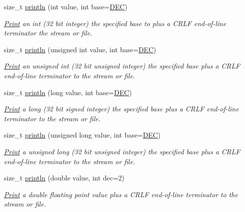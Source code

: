 \begin{DoxyCompactItemize}
size\+\_\+t \hyperlink{class_print_a82aa91bbd859f28a0a3b4869e5bfcadd}{println} (int value, int base=\hyperlink{docs_2src_2spark__wiring__print_8h_a26e216c38cffa0a9965fa7933ba558b1}{D\+EC})
\begin{DoxyCompactList}\small\item\em \hyperlink{class_print}{Print} an int (32 bit integer) the specified base to plus a C\+R\+LF end-\/of-\/line terminator the stream or file. \end{DoxyCompactList}\item 
size\+\_\+t \hyperlink{class_print_a2608232c1f10f654111ff447de16d60b}{println} (unsigned int value, int base=\hyperlink{docs_2src_2spark__wiring__print_8h_a26e216c38cffa0a9965fa7933ba558b1}{D\+EC})
\begin{DoxyCompactList}\small\item\em \hyperlink{class_print}{Print} an unsigned int (32 bit unsigned integer) the specified base plus a C\+R\+LF end-\/of-\/line terminator to the stream or file. \end{DoxyCompactList}\item 
size\+\_\+t \hyperlink{class_print_a82bbe59b28440c29e55ff3597eb45376}{println} (long value, int base=\hyperlink{docs_2src_2spark__wiring__print_8h_a26e216c38cffa0a9965fa7933ba558b1}{D\+EC})
\begin{DoxyCompactList}\small\item\em \hyperlink{class_print}{Print} a long (32 bit signed integer) the specified base plus a C\+R\+LF end-\/of-\/line terminator to the stream or file. \end{DoxyCompactList}\item 
size\+\_\+t \hyperlink{class_print_afa936d7e8dd329d9162f2cd28f42681e}{println} (unsigned long value, int base=\hyperlink{docs_2src_2spark__wiring__print_8h_a26e216c38cffa0a9965fa7933ba558b1}{D\+EC})
\begin{DoxyCompactList}\small\item\em \hyperlink{class_print}{Print} a unsigned long (32 bit unsigned integer) the specified base plus a C\+R\+LF end-\/of-\/line terminator to the stream or file. \end{DoxyCompactList}\item 
size\+\_\+t \hyperlink{class_print_a178b90baf9f74f0945f5c64aafec59ea}{println} (double value, int dec=2)
\begin{DoxyCompactList}\small\item\em \hyperlink{class_print}{Print} a double floating point value plus a C\+R\+LF end-\/of-\/line terminator to the stream or file. \end{DoxyCompactList}\item 

\end{DoxyCompactItemize}
